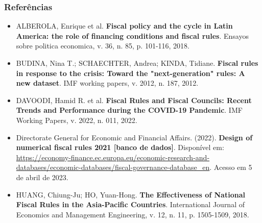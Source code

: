 \documentclass{beamer}
\begin{document}
\begin{frame}
\frametitle{Referências}

\begin{itemize}
    \item \small{ALBEROLA, Enrique et al. \textbf{Fiscal policy and the cycle in Latin America: the role of financing conditions and fiscal rules}. Ensayos sobre politica economica, v. 36, n. 85, p. 101-116, 2018.}
    \item BUDINA, Nina T.; SCHAECHTER, Andrea; KINDA, Tidiane. \textbf{Fiscal rules in response to the crisis: Toward the "next-generation" rules: A new dataset}. IMF working papers, v. 2012, n. 187, 2012.
    \item DAVOODI, Hamid R. et al. \textbf{Fiscal Rules and Fiscal Councils: Recent Trends and Performance during the COVID-19 Pandemic}. IMF Working Papers, v. 2022, n. 011, 2022.
    \item Directorate General for Economic and Financial Affairs. (2022). \textbf{Design of numerical fiscal rules 2021 [banco de dados]}. Disponível em: \url{https://economy-finance.ec.europa.eu/economic-research-and-databases/economic-databases/fiscal-governance-database_en}. Acesso em 5 de abril de 2023.
    \item HUANG, Chiung-Ju; HO, Yuan-Hong. \textbf{The Effectiveness of National Fiscal Rules in the Asia-Pacific Countries}. International Journal of Economics and Management Engineering, v. 12, n. 11, p. 1505-1509, 2018.
\end{itemize}


\end{frame}
\end{document}
